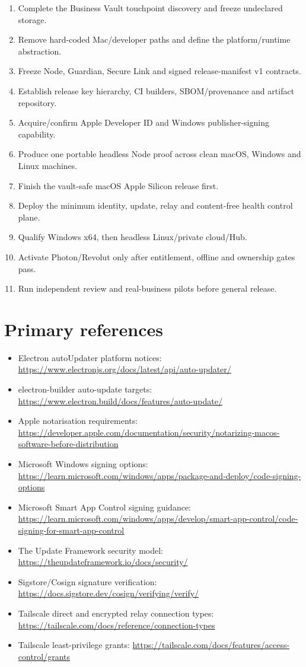 \documentclass[11pt]{article}
\begin{document}
\begin{enumerate}
  \item Complete the Business Vault touchpoint discovery and freeze undeclared storage.
  \item Remove hard-coded Mac/developer paths and define the platform/runtime abstraction.
  \item Freeze Node, Guardian, Secure Link and signed release-manifest v1 contracts.
  \item Establish release key hierarchy, CI builders, SBOM/provenance and artifact repository.
  \item Acquire/confirm Apple Developer ID and Windows publisher-signing capability.
  \item Produce one portable headless Node proof across clean macOS, Windows and Linux machines.
  \item Finish the vault-safe macOS Apple Silicon release first.
  \item Deploy the minimum identity, update, relay and content-free health control plane.
  \item Qualify Windows x64, then headless Linux/private cloud/Hub.
  \item Activate Photon/Revolut only after entitlement, offline and ownership gates pass.
  \item Run independent review and real-business pilots before general release.
\end{enumerate}

\section{Primary references}

\begin{itemize}
  \item Electron autoUpdater platform notices: \url{https://www.electronjs.org/docs/latest/api/auto-updater/}
  \item electron-builder auto-update targets: \url{https://www.electron.build/docs/features/auto-update/}
  \item Apple notarisation requirements: \url{https://developer.apple.com/documentation/security/notarizing-macos-software-before-distribution}
  \item Microsoft Windows signing options: \url{https://learn.microsoft.com/windows/apps/package-and-deploy/code-signing-options}
  \item Microsoft Smart App Control signing guidance: \url{https://learn.microsoft.com/windows/apps/develop/smart-app-control/code-signing-for-smart-app-control}
  \item The Update Framework security model: \url{https://theupdateframework.io/docs/security/}
  \item Sigstore/Cosign signature verification: \url{https://docs.sigstore.dev/cosign/verifying/verify/}
  \item Tailscale direct and encrypted relay connection types: \url{https://tailscale.com/docs/reference/connection-types}
  \item Tailscale least-privilege grants: \url{https://tailscale.com/docs/features/access-control/grants}
\end{itemize}
\end{document}
